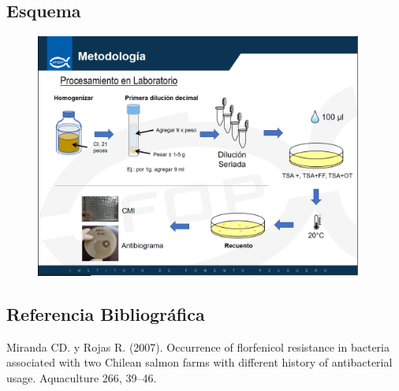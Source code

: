 \documentclass[
  letterpaper,
  DIV=11,
  numbers=noendperiod]{scrartcl}
\begin{document}
\hypertarget{esquema}{%
\subsection{Esquema}\label{esquema}}

\begin{figure}

{\centering \includegraphics[width=4.22917in,height=\textheight]{images/Esquema.png}

}

\end{figure}

\hypertarget{referencia-bibliogruxe1fica}{%
\subsection{Referencia
Bibliográfica}\label{referencia-bibliogruxe1fica}}

Miranda CD. y Rojas R. (2007). Occurrence of florfenicol resistance in
bacteria associated with two Chilean salmon farms with different history
of antibacterial usage. Aquaculture 266, 39--46.
\end{document}
